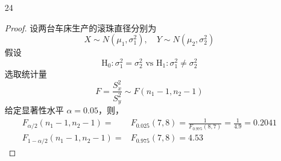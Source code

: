\documentclass[normal,cn]{elegantnote}
\begin{document}
\begin{enumerate}
\begin{proof}
            给定显著性水平 $\alpha=0.05$，对于 $n_{1}=9,n_{2}=8$，有$t_{1-\alpha/2}\left(n_{1}+n_{2}-2\right)=t_{0.975}(15)=2.1314$，双侧拒绝域为
            \begin{equation*}
                W=\{|t|\geq 2.1314\}
            \end{equation*}
            且有
            \begin{gather*}
                \bar{x}_{1}=0.230,\quad s_{1}^{2}=0.1337,\quad\bar{x}_{2}=0.269,\quad s_{2}^{2}=0.1736,\quad n_{1}=9,\quad n_{2}=8\\
                s_{w}=\sqrt{\frac{\left(n_{1}-1\right)s_{1}^{2}+\left(n_{2}-1\right)s_{2}^{2}}{n_{1}+n_{2}-2}}=\sqrt{\frac{8 \times 0.1337+7 \times 0.1736}{15}}=0.3903
            \end{gather*}
            则
            \begin{equation*}
                t=\frac{0.230-0.269}{0.3903\times\sqrt{\frac{1}{9}+\frac{1}{8}}}=-0.2056\notin W
            \end{equation*}
            故接受原假设，即可以认为东、西两支矿脉含锌量的平均值是一样的。
        \end{proof}
    \item[24]
        \begin{proof}
            设两台车床生产的滚珠直径分别为
            \begin{equation*}
                X\sim N\left(\mu_{1},\sigma_{1}^{2}\right),\quad Y\sim N\left(\mu_{2},\sigma_{2}^{2}\right)
            \end{equation*}
            假设
            \begin{equation*}
                \mathrm{H}_{0}:\sigma_{1}^{2}=\sigma_{2}^{2}\text{ vs }\mathrm{H}_{1}:\sigma_{1}^{2}\neq\sigma_{2}^{2}
            \end{equation*}
            选取统计量
            \begin{equation*}
                F=\frac{S_{x}^{2}}{S_{y}^{2}}\sim F\left(n_{1}-1,n_{2}-1\right)
            \end{equation*}
            给定显著性水平 $\alpha=0.05$，则，
            \begin{equation*}
                \begin{aligned}
                    F_{\alpha/2}\left(n_{1}-1,n_{2}-1\right)=   & F_{0.025}(7,8)=\frac{1}{F_{0.975}(8,7)}=\frac{1}{4.9}=0.2041 \\
                    F_{1-\alpha/2}\left(n_{1}-1,n_{2}-1\right)= & F_{0.975}(7,8)=4.53
                \end{aligned}

\end{equation*}
\end{proof}
\end{enumerate}
\end{document}
